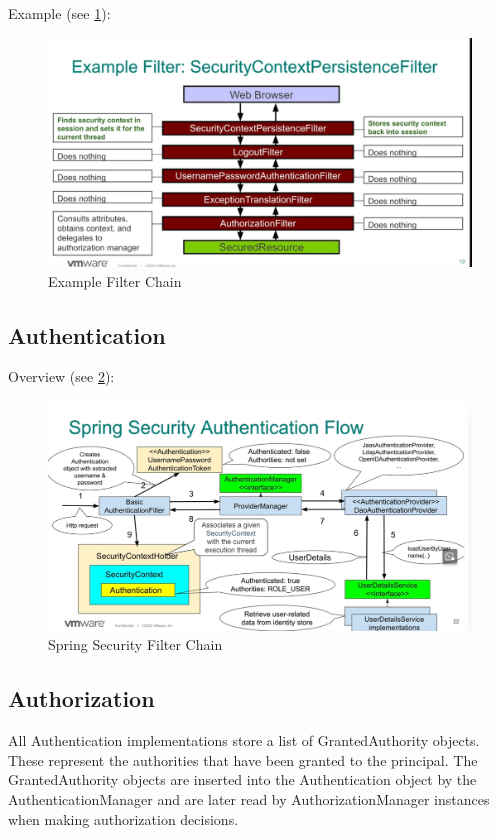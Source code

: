\documentclass{scrartcl}
\begin{document}
Example (see \ref{fig:filter-chain-example}):

\begin{figure}
    \centering
    \includegraphics[width=1\linewidth]{filter-chain-example}
    \caption{Example Filter Chain}
    \label{fig:filter-chain-example}
\end{figure}

\subsection{Authentication}

Overview (see \ref{fig:authentication}):

\begin{figure}
    \centering
    \includegraphics[width=1\linewidth]{authentication}
    \caption{Spring Security Filter Chain}
    \label{fig:authentication}
\end{figure}
\subsection{Authorization}

All Authentication implementations store a list of GrantedAuthority objects. These represent the authorities that have been granted to the principal. The GrantedAuthority objects are inserted into the Authentication object by the AuthenticationManager and are later read by AuthorizationManager instances when making authorization decisions.
\end{document}
